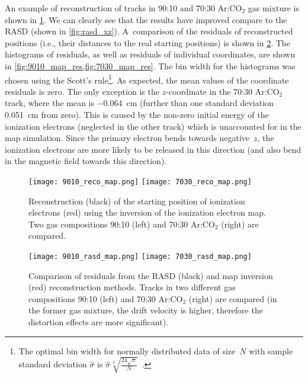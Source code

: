 			An example of reconstruction of tracks in 90:10 and 70:30 Ar:CO$_2$ gas mixture is shown in \cref{fig:reco_map}. We can clearly see that the results have improved compare to the \acf{RASD} (shown in \cref{fig:rasd_xz}). A~comparison of the residuals of reconstructed positions (i.e., their distances to the real starting positions) is shown in \cref{fig:rasd_map}. The histograms of residuals, as well as residuals of individual coordinates, are shown in \cref{fig:9010_map_res,fig:7030_map_res}. The bin width for the histograms was chosen using the Scott's rule\footnote{The optimal bin width for normally distributed data of size~$N$ with sample standard deviation $\hat{\sigma}$ is $\hat{\sigma}\sqrt[3]{\frac{24\sqrt{\pi}}{N}}$~\cite{scott}.}. As expected, the mean values of the coordinate residuals is zero. The only exception is the $z$\nobreakdash-coordinate in the 70:30 Ar:CO$_2$ track, where the mean is \qty{-0.064}{\cm} (further than one standard deviation \qty{0.051}{\cm} from zero). This is caused by the non-zero initial energy of the ionization electrons (neglected in the other track) which is unaccounted for in the map simulation. Since the primary electron bends towards negative~$z$, the ionization electrons are more likely to be released in this direction (and also bend in the magnetic field towards this direction).
			
			\begin{figure}
				\centering
				\texttt{[image: 9010\_reco\_map.png]}
				\hfill
				\texttt{[image: 7030\_reco\_map.png]}
				\caption{Reconstruction (black) of the starting position of ionization electrons (red) using the inversion of the ionization electron map. Two gas compositions 90:10 (left) and 70:30 Ar:CO$_2$ (right) are compared.}
				\label{fig:reco_map}
			\end{figure}
			
			\begin{figure}
				\centering
				\texttt{[image: 9010\_rasd\_map.png]}
				\hfill
				\texttt{[image: 7030\_rasd\_map.png]}
				\caption{Comparison of residuals from the \ac{RASD} (black) and map inversion (red) reconstruction methods. Tracks in two different gas compositions 90:10 (left) and 70:30 Ar:CO$_2$ (right) are compared (in the former gas mixture, the drift velocity is higher, therefore the distortion effects are more significant).}
				\label{fig:rasd_map}
			\end{figure}
			
